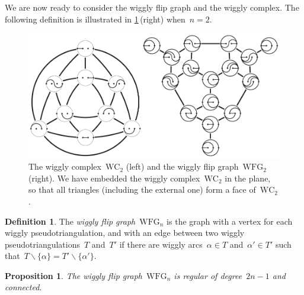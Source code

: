 \documentclass{amsart}
\newtheorem{proposition}[theorem]{Proposition}
\theoremstyle{definition}
\newtheorem{definition}[theorem]{Definition}
\newcommand{\ssm}{\smallsetminus} %
\newcommand{\darkblue}{\color{darkblue}} %
\newcommand{\defn}[1]{\textsl{\darkblue #1}} %
\newcommand{\vincent}[1]{\todo[color=blue!30]{\rm #1 \\ \hfill --- V.}}
\newcommand{\wigglyComplex}{\mathrm{WC}} %
\newcommand{\wigglyFlipGraph}{\mathrm{WFG}} %
\begin{document}

We are now ready to consider the wiggly flip graph and the wiggly complex.
The following definition is illustrated in \cref{fig:wigglyComplex}\,(right) when~$n = 2$.
%
\begin{figure}
\centerline{\includegraphics[scale=1.1]{wigglyComplex}}
\caption{The wiggly complex~$\wigglyComplex_2$ (left) and the wiggly flip graph~$\wigglyFlipGraph_2$ (right). We have embedded the wiggly complex~$\wigglyComplex_2$ in the plane, so that all triangles (including the external one) form a face of~$\wigglyComplex_2$.}
\label{fig:wigglyComplex}
\end{figure}

\begin{definition}
\label{def:wigglyFlipGraph}
The \defn{wiggly flip graph}~$\wigglyFlipGraph_n$ is the graph with a vertex for each wiggly pseudotriangulation, and with an edge between two wiggly pseudotriangulations~$T$ and~$T'$ if there are wiggly arcs~$\alpha \in T$ and~$\alpha' \in T'$ such that~$T \ssm \{\alpha\} = T' \ssm \{\alpha'\}$.
\end{definition}

\begin{proposition}
\label{prop:wigglyFlipGraph}
The wiggly flip graph~$\wigglyFlipGraph_n$ is regular of degree~$2n-1$ and connected.
\end{proposition}
\end{document}
